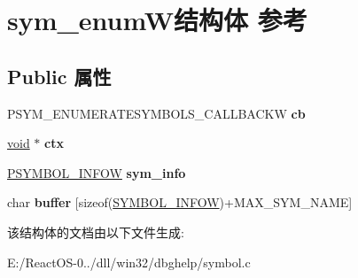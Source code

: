 \hypertarget{structsym__enum_w}{}\section{sym\+\_\+enum\+W结构体 参考}
\label{structsym__enum_w}
\subsection*{Public 属性}
\begin{DoxyCompactItemize}
\item 
\mbox{\label{structsym__enum_w_aa41375d92fbe91a23ae57c9f66b1dd89}} 
P\+S\+Y\+M\+\_\+\+E\+N\+U\+M\+E\+R\+A\+T\+E\+S\+Y\+M\+B\+O\+L\+S\+\_\+\+C\+A\+L\+L\+B\+A\+C\+KW {\bfseries cb}
\item 
\mbox{\label{structsym__enum_w_a38e040580089c6d727e7306c5676ed1b}} 
\hyperlink{interfacevoid}{void} $\ast$ {\bfseries ctx}
\item 
\mbox{\label{structsym__enum_w_a533579d43ae2d65e9c4aa2af66d49a4a}} 
\hyperlink{struct___s_y_m_b_o_l___i_n_f_o_w}{P\+S\+Y\+M\+B\+O\+L\+\_\+\+I\+N\+F\+OW} {\bfseries sym\+\_\+info}
\item 
\mbox{\label{structsym__enum_w_a269c02137b29c3bb6417b04e9a42dc87}} 
char {\bfseries buffer} \mbox{[}sizeof(\hyperlink{struct___s_y_m_b_o_l___i_n_f_o_w}{S\+Y\+M\+B\+O\+L\+\_\+\+I\+N\+F\+OW})+M\+A\+X\+\_\+\+S\+Y\+M\+\_\+\+N\+A\+ME\mbox{]}
\end{DoxyCompactItemize}


该结构体的文档由以下文件生成\+:\begin{DoxyCompactItemize}
\item 
E\+:/\+React\+O\+S-\/0../dll/win32/dbghelp/symbol.\+c\end{DoxyCompactItemize}
